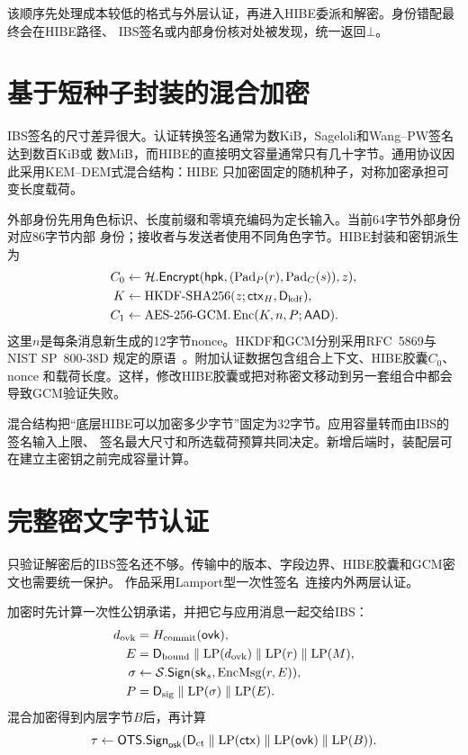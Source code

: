 该顺序先处理成本较低的格式与外层认证，再进入HIBE委派和解密。身份错配最终会在HIBE路径、
IBS签名或内部身份核对处被发现，统一返回$\bot$。

\section{基于短种子封装的混合加密}

IBS签名的尺寸差异很大。认证转换签名通常为数KiB，Sageloli和Wang--PW签名达到数百KiB或
数MiB，而HIBE的直接明文容量通常只有几十字节。通用协议因此采用KEM--DEM式混合结构：HIBE
只加密固定的随机种子，对称加密承担可变长度载荷。

外部身份先用角色标识、长度前缀和零填充编码为定长输入。当前64字节外部身份对应86字节内部
身份；接收者与发送者使用不同角色字节。HIBE封装和密钥派生为
\begin{align*}
 C_0&\leftarrow\mathcal H.\mathsf{Encrypt}
       (\mathsf{hpk},(\operatorname{Pad}_P(r),\operatorname{Pad}_C(s)),z),\\
 K&\leftarrow\operatorname{HKDF\text{-}SHA256}(z;\mathsf{ctx}_H,\mathsf D_{\rm kdf}),\\
 C_1&\leftarrow\operatorname{AES\text{-}256\text{-}GCM.Enc}(K,n,P;\mathsf{AAD}).
\end{align*}
这里$n$是每条消息新生成的12字节nonce。HKDF和GCM分别采用RFC~5869与NIST SP~800-38D
规定的原语~\cite{rfc5869,nist2007gcm}。附加认证数据包含组合上下文、HIBE胶囊$C_0$、nonce
和载荷长度。这样，修改HIBE胶囊或把对称密文移动到另一套组合中都会导致GCM验证失败。

混合结构把“底层HIBE可以加密多少字节”固定为32字节。应用容量转而由IBS的签名输入上限、
签名最大尺寸和所选载荷预算共同决定。新增后端时，装配层可在建立主密钥之前完成容量计算。

\section{完整密文字节认证}

只验证解密后的IBS签名还不够。传输中的版本、字段边界、HIBE胶囊和GCM密文也需要统一保护。
作品采用Lamport型一次性签名~\cite{lamport1979ots}连接内外两层认证。

加密时先计算一次性公钥承诺，并把它与应用消息一起交给IBS：
\begin{align*}
 d_{\rm ovk}&=H_{\rm commit}(\mathsf{ovk}),\\
 E&=\mathsf D_{\rm bound}\parallel\mathrm{LP}(d_{\rm ovk})
       \parallel\mathrm{LP}(r)\parallel\mathrm{LP}(M),\\
 \sigma&\leftarrow\mathcal S.\mathsf{Sign}
       (\mathsf{sk}_s,\operatorname{EncMsg}(r,E)),\\
 P&=\mathsf D_{\rm sig}\parallel\mathrm{LP}(\sigma)\parallel\mathrm{LP}(E).
\end{align*}
混合加密得到内层字节$B$后，再计算
\[
 \tau\leftarrow\mathsf{OTS.Sign}_{\mathsf{osk}}
    (\mathsf D_{\rm ct}\parallel\mathrm{LP}(\mathsf{ctx})
      \parallel\mathrm{LP}(\mathsf{ovk})\parallel\mathrm{LP}(B)).
\]


